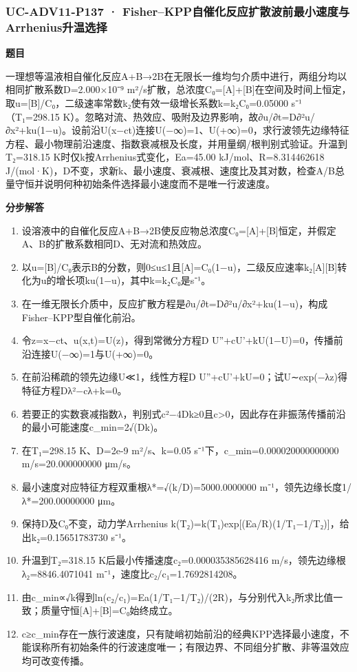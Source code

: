 \documentclass[UTF8,11pt,a4paper]{ctexart}
\begin{document}
\subsubsection*{UC-ADV11-P137 · Fisher–KPP自催化反应扩散波前最小速度与Arrhenius升温选择}
\noindent\textbf{题目}\par
一理想等温液相自催化反应A+B→2B在无限长一维均匀介质中进行，两组分均以相同扩散系数D=2.000×10⁻⁹ m²/s扩散，总浓度C₀=[A]+[B]在空间及时间上恒定，取u=[B]/C₀，二级速率常数k₂使有效一级增长系数k=k₂C₀=0.05000 s⁻¹（T₁=298.15 K）。忽略对流、热效应、吸附及边界影响，故∂u/∂t=D∂²u/∂x²+ku(1−u)。设前沿U(x−ct)连接U(−∞)=1、U(+∞)=0，求行波领先边缘特征方程、最小物理前沿速度、指数衰减根及长度，并用量纲/根判别式验证。升温到T₂=318.15 K时仅k按Arrhenius式变化，Ea=45.00 kJ/mol、R=8.314462618 J/(mol·K)，D不变，求新k、最小速度、衰减根、速度比及其对数，检查A/B总量守恒并说明何种初始条件选择最小速度而不是唯一行波速度。\par
\medskip\noindent\textbf{分步解答}
\begin{enumerate}
\item 设溶液中的自催化反应A+B→2B使反应物总浓度C₀=[A]+[B]恒定，并假定A、B的扩散系数相同D、无对流和热效应。
\item 以u=[B]/C₀表示B的分数，则0≤u≤1且[A]=C₀(1−u)，二级反应速率k₂[A][B]转化为u的增长项ku(1−u)，其中k=k₂C₀是s⁻¹。
\item 在一维无限长介质中，反应扩散方程是∂u/∂t=D∂²u/∂x²+ku(1−u)，构成Fisher–KPP型自催化前沿。
\item 令z=x−ct、u(x,t)=U(z)，得到常微分方程D U''+cU'+kU(1−U)=0，传播前沿连接U(−∞)=1与U(+∞)=0。
\item 在前沿稀疏的领先边缘U≪1，线性方程D U''+cU'+kU=0；试U∼exp(−λz)得特征方程Dλ²−cλ+k=0。
\item 若要正的实数衰减指数λ，判别式c²−4Dk≥0且c>0，因此存在非振荡传播前沿的最小可能速度c\_min=2√(Dk)。
\item 在T₁=298.15 K、D=2e-9 m²/s、k=0.05 s⁻¹下，c\_min=0.000020000000000 m/s=20.000000000 μm/s。
\item 最小速度对应特征方程双重根λ*=√(k/D)=5000.0000000 m⁻¹，领先边缘长度1/λ*=200.00000000 μm。
\item 保持D及C₀不变，动力学Arrhenius k(T₂)=k(T₁)exp[(Ea/R)(1/T₁−1/T₂)]，给出k₂=0.15651783730 s⁻¹。
\item 升温到T₂=318.15 K后最小传播速度c₂=0.000035385628416 m/s，领先边缘根λ₂=8846.4071041 m⁻¹，速度比c₂/c₁=1.7692814208。
\item 由c\_min∝√k得到ln(c₂/c₁)=Ea(1/T₁−1/T₂)/(2R)，与分别代入k₂所求比值一致；质量守恒[A]+[B]=C₀始终成立。
\item c≥c\_min存在一族行波速度，只有陡峭初始前沿的经典KPP选择最小速度，不能误称所有初始条件的行波速度唯一；有限边界、不同组分扩散、非等温效应均可改变传播。
\end{enumerate}
\end{document}
